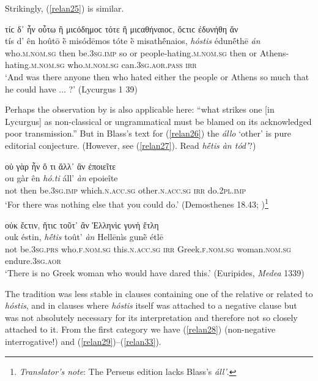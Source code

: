 Strikingly, (\ref{relan25}) is similar.

\begin{exe}
\ex τίϲ δ᾽ ἦν οὗτω ἢ μιϲόδημοϲ τότε ἢ μιϲαθήναιοϲ, ὅϲτιϲ έδυνήθη ἄν\\
\gll tís d' ên hoûtō ḕ misódēmos tóte ḕ misathḗnaios, \emph{hóstis} édunḗthē \emph{án}\\
who.\textsc{m.nom.sg} then be.\textsc{3sg.imp} so or people-hating.\textsc{m.nom.sg} then or Athens-hating.\textsc{m.nom.sg} who.\textsc{m.nom.sg} can.\textsc{3sg.aor.pass} \textsc{irr}\\
\trans `And was there anyone then who hated either the people or Athens so much that he could have ... ?' (Lycurgus 1 39)
\label{relan25}
\end{exe}

Perhaps the observation by \citet[103]{Blass1880} is also applicable here: ``what strikes one {[}in Lycurgus{]} as non-classical or ungrammatical must be blamed on its acknowledged poor transmission.'' But in Blass's text for (\ref{relan26}) the \emph{állo} `other' is pure editorial conjecture. (However, see (\ref{relan27}). Read \textit{hḗtis àn tód'}?)

\begin{exe}
\ex οὐ γὰρ ἦν ὅ τι ἄλλ᾽ ἂν ἐποιεῖτε\\
\gll ou gàr ên \emph{hó.ti} áll' \emph{àn} epoieîte\\
not then be.\textsc{3sg.imp} which.\textsc{n.acc.sg} other.\textsc{n.acc.sg} \textsc{irr} do.\textsc{2pl.imp}\\
\trans `For there was nothing else that you could do.' (Demosthenes 18.43; \citealp{Blass1877})\footnote{\emph{Translator's note}: The Perseus edition lacks Blass's \textit{áll'}.}
\label{relan26}
\end{exe}

\begin{exe}
\ex οὐκ ἔϲτιν, ἥτιϲ τοῦτ᾽ ἂν Ἑλληνὶϲ γυνὴ ἔτλη\\
\gll ouk éstin, \emph{hḗtis} toût' \emph{àn} Hellēnìs gunḕ étlē\\
not be.\textsc{3sg.prs} who.\textsc{f.nom.sg} this.\textsc{n.acc.sg} \textsc{irr} Greek.\textsc{f.nom.sg} woman.\textsc{nom.sg} endure.\textsc{3sg.aor}\\
\trans `There is no Greek woman who would have dared this.' (Euripides, \textit{Medea} 1339)
\label{relan27}
\end{exe}

The tradition was less stable in clauses containing one of the relative  or  related to \emph{hóstis}, and in clauses where \emph{hóstis} itself was attached to a negative clause but was not absolutely necessary for its interpretation and therefore not so closely attached to it. From the first category we have (\ref{relan28}) (non-negative interrogative!) and (\ref{relan29})--(\ref{relan33}).

